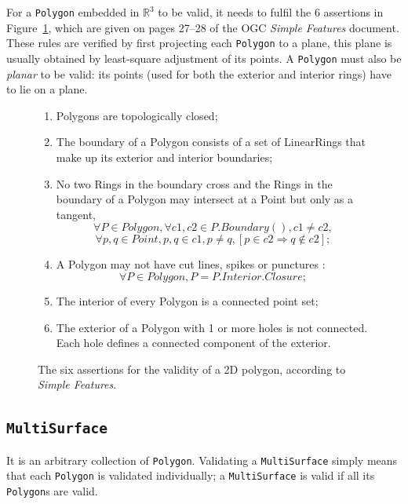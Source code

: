 For a \texttt{Polygon} embedded in $\mathbb{R}^3$ to be valid, it needs to fulfil the 6 assertions in Figure~\ref{fig:ogcsf_definitions}, which are given on pages 27--28 of the OGC \emph{Simple Features} document.
These rules are verified by first projecting each \texttt{Polygon} to a plane, this plane is usually obtained by least-square adjustment of its points.
A \texttt{Polygon} must also be \emph{planar} to be valid: its points (used for both the exterior and interior rings) have to lie on a plane.
\begin{figure}
  \centering
  \begin{boxedminipage}{\textwidth}
    {\small
  \begin{enumerate}
    \item Polygons are topologically closed;
    \item The boundary of a Polygon consists of a set of LinearRings that make up its exterior and interior boundaries;
    \item No two Rings in the boundary cross and the Rings in the boundary of a Polygon may intersect at a Point but only as a tangent, \eg\
      \[
         \forall P \in Polygon, \forall c1, c2 \in P.Boundary(), c1 \neq c2,
      \]
      \[
          \forall p, q \in Point, p, q \in c1, p \neq q, [p \in c2 \Rightarrow q \notin c2];
      \]
    \item A Polygon may not have cut lines, spikes or punctures \eg:
      \[
         \forall P \in Polygon, P = P.Interior.Closure;
      \]
    \item The interior of every Polygon is a connected point set;
    \item The exterior of a Polygon with 1 or more holes is not connected. Each hole defines a connected component of the exterior.
  \end{enumerate}
  }
  \end{boxedminipage}
\caption{The six assertions for the validity of a 2D polygon, according to \emph{Simple Features}.}%
\label{fig:ogcsf_definitions}
\end{figure}



\subsection{\texttt{MultiSurface}}
It is an arbitrary collection of \texttt{Polygon}.
Validating a \texttt{MultiSurface} simply means that each \texttt{Polygon} is validated individually; a \texttt{MultiSurface} is valid if all its \texttt{Polygon}s are valid.


